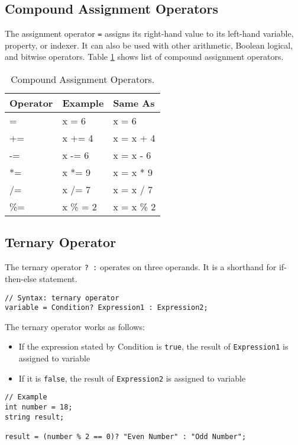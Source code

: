 \subsection{Compound Assignment Operators}
	 The assignment operator \texttt{=} assigns its right-hand value to its left-hand variable, property, or indexer. It can also be used with other arithmetic, Boolean logical, and bitwise operators. Table {\ref{tab:compound-assignment-operator}} shows list of compound assignment operators.
	 \begin{table}[ht]
	 	\centering
	 	\caption{Compound Assignment Operators.}\label{tab:compound-assignment-operator}
	 \begin{tabular}{p{4cm}p{3cm}p{3cm}}
	 	\toprule
	 	Operator & Example  & Same As    \\ \midrule
	 	=        & x = 6    & x = 6      \\
	 	+=       & x += 4   & x = x + 4  \\
	 	-=       & x -= 6   & x = x - 6  \\
	 	*=       & x *= 9   & x = x * 9  \\
	 	/=       & x /= 7   & x = x / 7  \\
	 	\%=      & x \% = 2 & x = x \% 2 \\ \bottomrule
	 \end{tabular}
	 \end{table}


\subsection{Ternary Operator}
The ternary operator \verb|? :| operates on three operands. It is a shorthand for if-then-else statement.

\begin{lstlisting}[numbers=none]
// Syntax: ternary operator
variable = Condition? Expression1 : Expression2;
\end{lstlisting}

The ternary operator works as follows:
\begin{itemize}
	\item If the expression stated by Condition is \verb|true|, the result of \verb|Expression1| is assigned to variable
	\item If it is \verb|false|, the result of \verb|Expression2| is assigned to variable
\end{itemize}

\begin{lstlisting}[numbers=none]
// Example
int number = 18;
string result;

result = (number % 2 == 0)? "Even Number" : "Odd Number";
\end{lstlisting}

